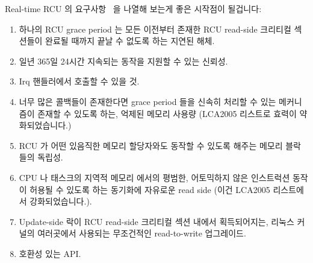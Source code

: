 Real-time RCU 의 요구사항~\cite{PaulMcKenney05b} 을 나열해 보는게 좋은 시작점이
될겁니다:
\iffalse

The list of real-time RCU desiderata~\cite{PaulMcKenney05b}
is a very good start:
\fi

\begin{enumerate}
\item	하나의 RCU grace period 는 모든 이전부터 존재한 RCU read-side 크리티컬
	섹션들이 완료될 때까지 끝날 수 없도록 하는 지연된 해체.
\item	일년 365일 24시간 지속되는 동작을 지원할 수 있는 신뢰성.
\item	Irq 핸들러에서 호출할 수 있을 것.
\item	너무 많은 콜백들이 존재한다면 grace period 들을 신속히 처리할 수 있는
	메커니즘이 존재할 수 있도록 하는, 억제된 메모리 사용량 (LCA2005
	리스트로 효력이 약화되었습니다.)
\item	RCU 가 어떤 있음직한 메모리 할당자와도 동작할 수 있도록 해주는 메모리
	블락들의 독립성.
\item	CPU 나 태스크의 지역적 메모리 에서의 평범한, 어토믹하지 않은 인스트럭션
	동작이 허용될 수 있도록 하는 동기화에 자유로운 read side (이건 LCA2005
	리스트에서 강화되었습니다.).
\item	Update-side 락이 RCU read-side 크리티컬 섹션 내에서 획득되어지는,
	리눅스 커널의 여러곳에서 사용되는 무조건적인 read-to-write 업그레이드.
\item	호환성 있는 API.
\iffalse

\item	Deferred destruction, so that an RCU grace period cannot end
	until all pre-existing RCU read-side critical sections have
	completed.
\item	Reliable, so that RCU supports 24x7 operation for years at
	a time.
\item	Callable from irq handlers.
\item	Contained memory footprint, so that mechanisms exist to expedite
	grace periods if there are too many callbacks.  (This is weakened
	from the LCA2005 list.)
\item	Independent of memory blocks, so that RCU can work with any
	conceivable memory allocator.
\item	Synchronization-free read side, so that only normal non-atomic
	instructions operating on CPU- or task-local memory are permitted.
	(This is strengthened from the LCA2005 list.)
\item	Unconditional read-to-write upgrade, which is used in several
	places in the Linux kernel where the update-side lock is
	acquired within the RCU read-side critical section.
\item	Compatible API.
\fi


\end{enumerate}
